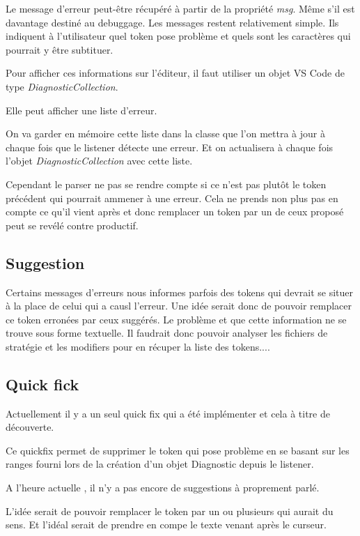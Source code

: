 \documentclass[
    iict, %
    il, %
]{heig-tb}
\begin{document}
Le message d'erreur peut-être récupéré à partir de la propriété \emph{msg}. Même s'il est davantage destiné au debuggage.
Les messages restent relativement simple. Ils indiquent à l'utilisateur quel token pose problème et quels sont les caractères qui pourrait y être subtituer.

Pour afficher ces informations sur l'éditeur, il faut utiliser un objet VS Code de type \emph{DiagnosticCollection}.

Elle peut afficher une liste d'erreur.

On va garder en mémoire cette liste dans la classe que l'on mettra à jour à chaque fois que le listener détecte une erreur.
Et on actualisera à chaque fois l'objet \emph{DiagnosticCollection} avec cette liste.

Cependant le parser ne pas se rendre compte si ce n'est pas plutôt le token précédent qui pourrait ammener à une erreur.
Cela ne prends non plus pas en compte ce qu'il vient après et donc remplacer un token par un de ceux proposé peut se revélé contre productif.

\subsection{Suggestion}
Certains messages d'erreurs nous informes parfois des tokens qui devrait se situer à la place de celui qui a causl l'erreur.
Une idée serait donc de pouvoir remplacer ce token erronées par ceux suggérés.
Le problème et que cette information ne se trouve sous forme textuelle.
Il faudrait donc pouvoir analyser les fichiers de stratégie et les modifiers pour en récuper la liste des tokens....


\subsection{Quick fick}

Actuellement il y a un seul quick fix qui a été implémenter et cela à titre de découverte.

Ce quickfix permet de supprimer le token qui pose problème en se basant sur les ranges fourni lors de la création d'un objet Diagnostic depuis le listener.

A l'heure actuelle , il n'y a pas encore de suggestions à proprement parlé.

L'idée serait de pouvoir remplacer le token par un ou plusieurs qui aurait du sens.
Et l'idéal serait de prendre en compe le texte venant après le curseur.
\end{document}
